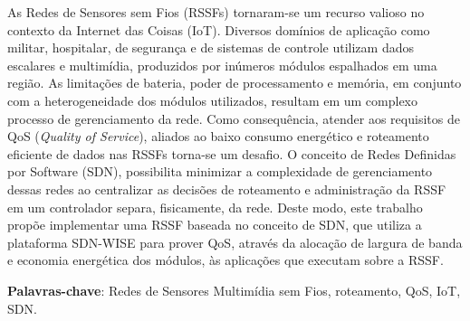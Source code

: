 \documentclass[
	10pt,				%
	openright,			%
	twoside,			%
	a4paper,			%
	chapter=TITLE,		%
	english,			%
	brazil				%
	]{abntex2}
\begin{document}
\frenchspacing 



\imprimircapa
\imprimirfolhaderosto*

\setlength{\absparsep}{18pt} %
\begin{resumo}
 
As Redes de Sensores sem Fios (RSSFs) tornaram-se um recurso valioso no contexto da Internet das Coisas (IoT). Diversos domínios de aplicação como militar, hospitalar, de segurança e de sistemas de controle utilizam dados escalares e multimídia, produzidos por inúmeros módulos espalhados em uma região. As limitações de bateria, poder de processamento e memória, em conjunto com a heterogeneidade dos módulos utilizados, resultam em um complexo processo de gerenciamento da rede. Como consequência, atender aos requisitos de QoS (\textit{Quality of Service}), aliados ao baixo consumo energético e roteamento eficiente de dados nas RSSFs torna-se um desafio. O conceito de Redes Definidas por Software (SDN), possibilita minimizar a complexidade de gerenciamento dessas redes ao centralizar as decisões de roteamento e administração da RSSF em um controlador separa, fisicamente, da rede. Deste modo, este trabalho propõe implementar uma RSSF baseada no conceito de SDN, que utiliza a plataforma SDN-WISE para prover QoS, através da alocação de largura de banda e economia energética dos módulos, às aplicações que executam sobre a RSSF.

\textbf{Palavras-chave}: Redes de Sensores Multimídia sem Fios, roteamento, QoS, IoT, SDN.

\end{resumo}

\listoffigures*
\cleardoublepage
\end{document}
